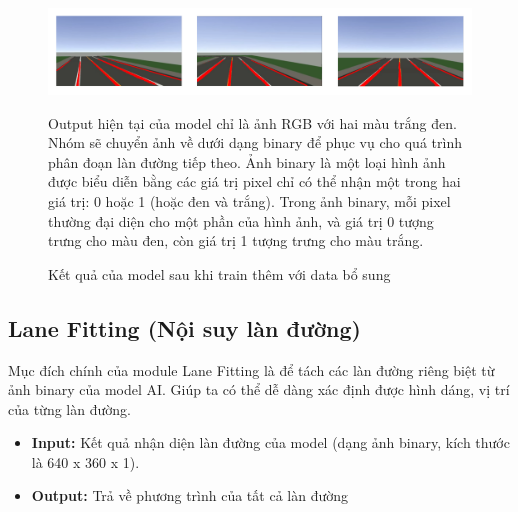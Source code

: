 \begin{figure}[!hbt]
\begin{center}
    \includegraphics[width=15cm]{img/4_Implement/ai/simulation_result.png}
    \caption{Kết quả của model sau khi train thêm với data bổ sung}
\end{center}
Output hiện tại của model chỉ là ảnh RGB với hai màu trắng đen. Nhóm sẽ chuyển ảnh về dưới dạng binary để phục vụ cho quá trình phân đoạn làn đường tiếp theo. Ảnh binary là một loại hình ảnh được biểu diễn bằng các giá trị pixel chỉ có thể nhận một trong hai giá trị: 0 hoặc 1 (hoặc đen và trắng). Trong ảnh binary, mỗi pixel thường đại diện cho một phần của hình ảnh, và giá trị 0 tượng trưng cho màu đen, còn giá trị 1 tượng trưng cho màu trắng.
\end{figure}
\newpage
\subsection{Lane Fitting (Nội suy làn đường)}
Mục đích chính của module Lane Fitting là để tách các làn đường riêng biệt từ ảnh binary của model AI. Giúp ta có thể dễ dàng xác định được hình dáng, vị trí của từng làn đường.
\begin{itemize}
    \item \textbf{Input:} Kết quả nhận diện làn đường của model (dạng ảnh binary, kích thước là 640 x 360 x 1).
    \item \textbf{Output:} Trả về phương trình của tất cả làn đường 
\end{itemize}
